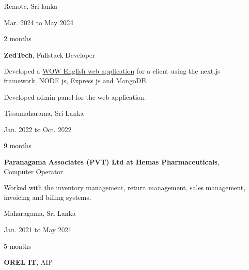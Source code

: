
\begin{twocolentry}{
      Remote, Sri lanka

      Mar. 2024 to May 2024

      2 months
   }
   \textbf{ZedTech}, Fullstack Developer
   \begin{highlights}
      \item Developed a \href{https://wowenglish.lk}{WOW English web application} for a client using the next.js framework, NODE js, Express js and MongoDB.
      \item Developed admin panel for the web application.
   \end{highlights}
\end{twocolentry}

\vspace{0.2 cm}

\begin{twocolentry}{
      Tissamaharama, Sri Lanka

      Jan. 2022 to Oct. 2022

      9 months
   }
   \textbf{Paranagama Associates (PVT) Ltd at Hemas Pharmaceuticals}, Computer Operator
   \begin{highlights}
      \item Worked with the inventory management, return management, sales management, invoicing and billing systems.
   \end{highlights}
\end{twocolentry}


\vspace{0.2 cm}

\begin{twocolentry}{
      Maharagama, Sri Lanka

      Jan. 2021 to May 2021

      5 months
   }
   \textbf{OREL IT}, AIP
\end{twocolentry}